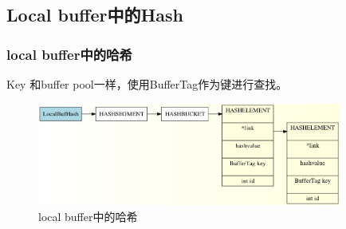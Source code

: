 \documentclass{beamer}
\begin{document}
\begin{CJK*}{UTF8}{gkai}
\section{Local buffer中的Hash} 

\begin{frame}
\transdissolve
\frametitle{local buffer中的哈希}
\begin{exampleblock}{Key}
和buffer pool一样，使用BufferTag作为键进行查找。
\end{exampleblock}
\begin{figure}[!ht]
\centering
\includegraphics[width = 100mm]{local.jpg}
\caption{local buffer中的哈希}
\label{overflow}
\end{figure}
\end{frame}


\end{CJK*}
\end{document}
